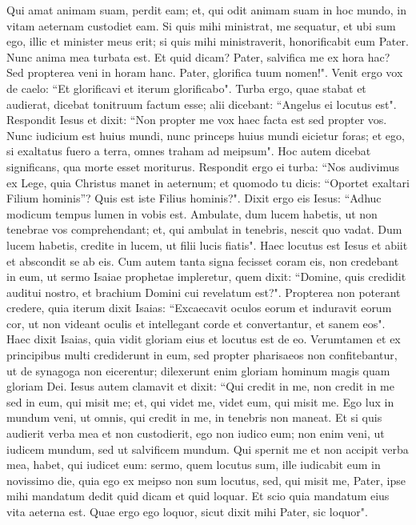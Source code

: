 \begin{biblechapter}
\verse Qui amat animam suam, perdit eam; et, qui odit animam suam in hoc mundo, in vitam aeternam custodiet eam. 
\verse Si quis mihi ministrat, me sequatur, et ubi sum ego, illic et minister meus erit; si quis mihi ministraverit, honorificabit eum Pater. 
\verse Nunc anima mea turbata est. Et quid dicam? Pater, salvifica me ex hora hac? Sed propterea veni in horam hanc. 
\verse Pater, glorifica tuum nomen!". Venit ergo vox de caelo: “Et glorificavi et iterum glorificabo". 
\verse Turba ergo, quae stabat et audierat, dicebat tonitruum factum esse; alii dicebant: “Angelus ei locutus est". 
\verse Respondit Iesus et dixit: “Non propter me vox haec facta est sed propter vos. 
\verse Nunc iudicium est huius mundi, nunc princeps huius mundi eicietur foras; 
\verse et ego, si exaltatus fuero a terra, omnes traham ad meipsum". 
\verse Hoc autem dicebat significans, qua morte esset moriturus. 
\verse Respondit ergo ei turba: “Nos audivimus ex Lege, quia Christus manet in aeternum; et quomodo tu dicis: “Oportet exaltari Filium hominis”? Quis est iste Filius hominis?". 
\verse Dixit ergo eis Iesus: “Adhuc modicum tempus lumen in vobis est. Ambulate, dum lucem habetis, ut non tenebrae vos comprehendant; et, qui ambulat in tenebris, nescit quo vadat.  
\verse Dum lucem habetis, credite in lucem, ut filii lucis fiatis". Haec locutus est Iesus et abiit et abscondit se ab eis. 
\verse Cum autem tanta signa fecisset coram eis, non credebant in eum, 
\verse ut sermo Isaiae prophetae impleretur, quem dixit: “Domine, quis credidit auditui nostro, et brachium Domini cui revelatum est?". 
\verse Propterea non poterant credere, quia iterum dixit Isaias: 
\verse “Excaecavit oculos eorum et induravit eorum cor, ut non videant oculis et intellegant corde et convertantur, et sanem eos". 
\verse Haec dixit Isaias, quia vidit gloriam eius et locutus est de eo. 
\verse Verumtamen et ex principibus multi crediderunt in eum, sed propter pharisaeos non confitebantur, ut de synagoga non eicerentur; 
\verse dilexerunt enim gloriam hominum magis quam gloriam Dei. 
\verse Iesus autem clamavit et dixit: “Qui credit in me, non credit in me sed in eum, qui misit me; 
\verse et, qui videt me, videt eum, qui misit me. 
\verse Ego lux in mundum veni, ut omnis, qui credit in me, in tenebris non maneat. 
\verse Et si quis audierit verba mea et non custodierit, ego non iudico eum; non enim veni, ut iudicem mundum, sed ut salvificem mundum. 
\verse Qui spernit me et non accipit verba mea, habet, qui iudicet eum: sermo, quem locutus sum, ille iudicabit eum in novissimo die, 
\verse quia ego ex meipso non sum locutus, sed, qui misit me, Pater, ipse mihi mandatum dedit quid dicam et quid loquar. 
\verse Et scio quia mandatum eius vita aeterna est. Quae ergo ego loquor, sicut dixit mihi Pater, sic loquor". 
\end{biblechapter}

